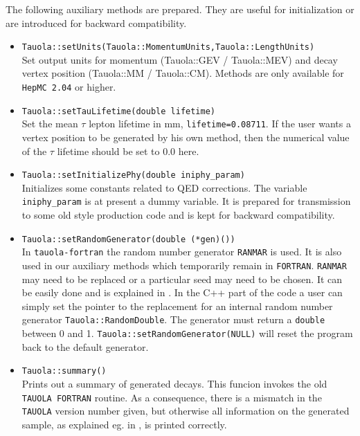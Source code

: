 \documentclass[]{Tauola_interface_design}
\begin{document}
The following auxiliary methods are prepared. They are useful for initialization 
or are introduced for backward compatibility.
\begin{itemize}
  \item {\tt Tauola::setUnits(Tauola::MomentumUnits,Tauola::LengthUnits)} \\
        Set output units for momentum (Tauola::GEV / Tauola::MEV)
        and decay vertex position (Tauola::MM / Tauola::CM). Methods are only available for {\tt HepMC 2.04} 
        or higher.
  \item {\tt Tauola::setTauLifetime(double lifetime)} \\
        Set the mean $\tau$ lepton lifetime in mm, {\tt lifetime=0.08711}. 
        If the user wants a vertex position
        to be generated by his own method, then the numerical value
        of the $\tau$ lifetime should be set to 0.0 here.
  \item {\tt Tauola::setInitializePhy(double iniphy\_param)} \\
        Initializes some constants related to QED corrections.
        The variable {\tt iniphy\_param} is at present a dummy variable. It is prepared for
        transmission to some
        old style production code and is kept for backward compatibility.
  \item {\tt Tauola::setRandomGenerator(double (*gen)())} \\
        In {\tt tauola-fortran} the random number generator {\tt RANMAR}
        is used. It is also used in our auxiliary methods which temporarily remain
        in {\tt FORTRAN}. {\tt RANMAR} may need to be replaced or a particular 
        seed may need to be chosen. It can be easily done and is explained in
        \cite{Golonka:2003xt}. In the C++ part of the code a user can simply 
        set the pointer to the replacement for an internal random number 
        generator {\tt Tauola::RandomDouble}.
        The generator must return  a {\tt double} between 0 and 1. 
        {\tt Tauola::setRandomGenerator(NULL)} will reset the program back to  
        the default  generator.
  \item {\tt Tauola::summary()} \\
        Prints out a summary of generated decays.
        This funcion invokes the old {\tt TAUOLA FORTRAN} routine. As a consequence,
        there is a mismatch in the {\tt TAUOLA} version number given,
        but otherwise all information on the generated sample, 
        as explained eg. in \cite{Jadach:1990mz,Jezabek:1991qp,Jadach:1993hs}, is printed correctly. 
\end{itemize}
\end{document}
